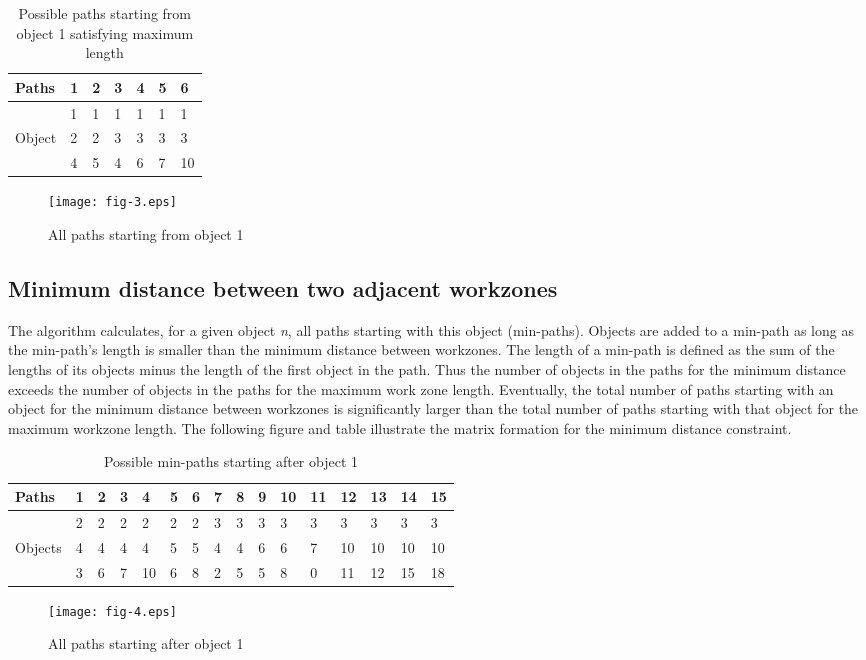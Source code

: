 \documentclass[a4paper,3p,times,authoryear]{elsarticle}
\begin{document}
\begin{table}[H]
	\centering
	\caption{Possible paths starting from object 1 satisfying maximum length} \label{tbl:1}
	\begin{tabular}{|l|l|l|l|l|l|l|}
\hline
Paths & 1 & 2 & 3 & 4 & 5 & 6 \\ 
\hline
 & 1 & 1 & 1 & 1 & 1 & 1 \\ 
\cline{2-7}
Object & 2 & 2 & 3 & 3 & 3 & 3 \\ 
\cline{2-7}
 & 4 & 5 & 4 & 6 & 7 & 10 \\ 
\hline
\end{tabular}	
\end{table}

\begin{figure}[H]
\begin{center}
\texttt{[image: fig-3.eps]}
\caption{All paths starting from object 1}\label{fig:3}
\end{center}
\end{figure}
\subsection{Minimum distance between two adjacent workzones}

The algorithm calculates, for a given object \textit{n}, all paths starting with
this object (min-paths). Objects are added to a min-path as long as the
min-path's length is smaller than the minimum distance between workzones. The
length of a min-path is defined as the sum of the lengths of its objects minus
the length of the first object in the path. Thus the number of objects in the
paths for the minimum distance exceeds the number of objects in the paths for the
maximum work zone length. Eventually, the total number of paths starting with an
object for the minimum distance between workzones is significantly larger than
the total number of paths starting with that object for the maximum workzone
length. The following figure and table illustrate the matrix formation for the
minimum distance constraint.
\begin{table}[H]
	\centering
	\caption{Possible min-paths starting after object 1} \label{tbl:2}
	\begin{tabular}{|l|l|l|l|l|l|l|l|l|l|l|l|l|l|l|l|}
\hline
Paths & 1 & 2 & 3 & 4 & 5 & 6 & 7 & 8 & 9 & 10 & 11 & 12 & 13 & 14 & 15 \\ 
\hline
 & 2 & 2 & 2 & 2 & 2 & 2 & 3 & 3 & 3 & 3 & 3 & 3 & 3 & 3 & 3 \\ 
\cline{2-16}
Objects & 4 & 4 & 4 & 4 & 5 & 5 & 4 & 4 & 6 & 6 & 7 & 10 & 10 & 10 & 10 \\ 
\cline{2-16}
 & 3 & 6 & 7 & 10 & 6 & 8 & 2 & 5 & 5 & 8 & 0 & 11 & 12 & 15 & 18 \\ 
\hline
\end{tabular}
\end{table}
\begin{figure}[H]
\begin{center}
\texttt{[image: fig-4.eps]}
\caption{All paths starting after object 1}
\end{center}
\end{figure}
\end{document}
